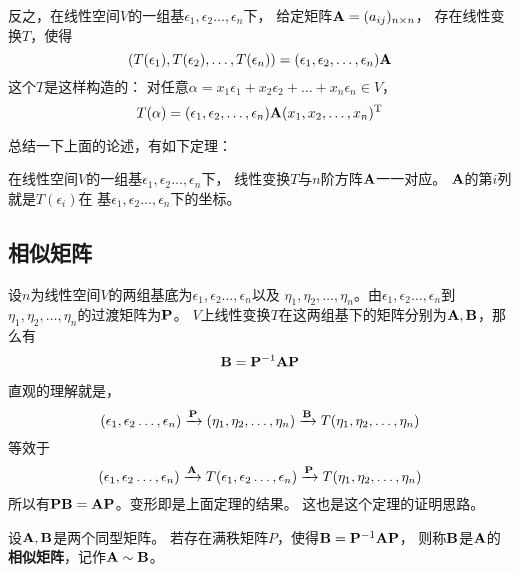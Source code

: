 反之，在线性空间$V$的一组基$\epsilon_1,\epsilon_2\dots,\epsilon_n$下，
给定矩阵$\mathbf{A}=(a_{ij})_{n\times n}$，
存在线性变换$T$，使得
\begin{displaymath}
  (T(\epsilon_1), T(\epsilon_2),\dots,T(\epsilon_n)) =
    (\epsilon_1,\epsilon_2,\dots,\epsilon_n)\mathbf{A}
\end{displaymath}
这个$T$是这样构造的：
对任意$\alpha=x_1\epsilon_1+x_2\epsilon_2+\dots+x_n\epsilon_n\in V$，
\begin{displaymath}
  T(\alpha) = (\epsilon_1,\epsilon_2,\dots,\epsilon_n)\mathbf{A}
    (x_1,x_2,\dots,x_n)^{\textrm{T}}
\end{displaymath}

总结一下上面的论述，有如下定理：
\begin{theorem}
  在线性空间$V$的一组基$\epsilon_1,\epsilon_2\dots,\epsilon_n$下，
  线性变换$T$与$n$阶方阵$\mathbf{A}$一一对应。
  $\mathbf{A}$的第$i$列就是$T(\epsilon_i)$在
  基$\epsilon_1,\epsilon_2\dots,\epsilon_n$下的坐标。
\end{theorem}

\subsection{相似矩阵}
\begin{theorem}
  设$n$为线性空间$V$的两组基底为$\epsilon_1,\epsilon_2\dots,\epsilon_n$以及
  $\eta_1,\eta_2,\dots,\eta_n$。由$\epsilon_1,\epsilon_2\dots,\epsilon_n$到
  $\eta_1,\eta_2,\dots,\eta_n$的过渡矩阵为$\mathbf{P}$。
  $V$上线性变换$T$在这两组基下的矩阵分别为$\mathbf{A},\mathbf{B}$，那么有
  \[ \mathbf{B} = \mathbf{P}^{-1}\mathbf{A}\mathbf{P} \]  
\end{theorem}

\begin{remark}
  直观的理解就是，
  \begin{displaymath}
    (\epsilon_1,\epsilon_2\dots,\epsilon_n)\xrightarrow{\mathbf{P}}
    (\eta_1,\eta_2,\dots,\eta_n)\xrightarrow{\mathbf{B}}
    T(\eta_1,\eta_2,\dots,\eta_n)
  \end{displaymath}
  等效于
  \begin{displaymath}
  (\epsilon_1,\epsilon_2\dots,\epsilon_n)\xrightarrow{\mathbf{A}}
  T(\epsilon_1,\epsilon_2\dots,\epsilon_n)\xrightarrow{\mathbf{P}}
  T(\eta_1,\eta_2,\dots,\eta_n)
  \end{displaymath}
  所以有$\mathbf{P}\mathbf{B}=\mathbf{A}\mathbf{P}$。变形即是上面定理的结果。
  这也是这个定理的证明思路。
\end{remark}

\begin{definition}[相似矩阵]
  设$\mathbf{A},\mathbf{B}$是两个同型矩阵。
  若存在满秩矩阵$P$，使得$\mathbf{B}=\mathbf{P}^{-1}\mathbf{A}\mathbf{P}$，
  则称$\mathbf{B}$是$\mathbf{A}$的\textbf{相似矩阵}，记作$\mathbf{A}\sim\mathbf{B}$。
\end{definition}

